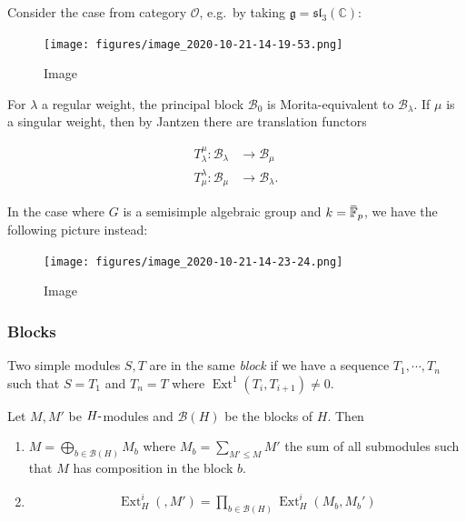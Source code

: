 Consider the case from category \({\mathcal{O}}\), e.g.~by taking
\({\mathfrak{g}}= {\mathfrak{sl}}_3({\mathbb{C}})\):

\begin{figure}
\centering
\texttt{[image: figures/image\_2020-10-21-14-19-53.png]}
\caption{Image}
\end{figure}

For \(\lambda\) a regular weight, the principal block \(\mathcal{B}_0\)
is Morita-equivalent to \(\mathcal{B}_\lambda\). If \(\mu\) is a
singular weight, then by Jantzen there are translation functors

\begin{align*}   T_\lambda^\mu: \mathcal{B}_\lambda &\to \mathcal{B}_\mu \\ T_\mu^\lambda: \mathcal{B}_\mu &\to \mathcal{B}_\lambda .\end{align*}

In the case where \(G\) is a semisimple algebraic group and
\(k = \mkern 1.5mu\overline{\mkern-1.5mu{\mathbb{F}}\mkern-1.5mu}\mkern 1.5mu_p\),
we have the following picture instead:

\begin{figure}
\centering
\texttt{[image: figures/image\_2020-10-21-14-23-24.png]}
\caption{Image}
\end{figure}

\hypertarget{blocks}{%
\subsubsection{Blocks}\label{blocks}}

Two simple modules \(S, T\) are in the same \emph{block} if we have a
sequence \(T_1, \cdots, T_n\) such that \(S=T_1\) and \(T_n = T\) where
\(\operatorname{Ext}^1(T_i, T_{i+1}) \neq 0\).

\begin{lemma}[?]

\begin{lemma}[?]

Let \(M, M'\) be \(H{\hbox{-}}\)modules and \(\mathcal{B}(H)\) be the
blocks of \(H\). Then

\begin{enumerate}
\def\labelenumi{\arabic{enumi}.}
\item
  \(M = \bigoplus_{b\in \mathcal{B}(H)} M_b\) where
  \(M_b = \sum_{M'\leq M} M'\) the sum of all submodules such that \(M\)
  has composition in the block \(b\).
\item
  \begin{align*} \operatorname{Ext}_H^i(, M') = \prod_{b\in\mathcal{B}(H)} \operatorname{Ext}_H^i (M_b, M_b') \end{align*}
\end{enumerate}

\end{lemma}

\end{lemma}

